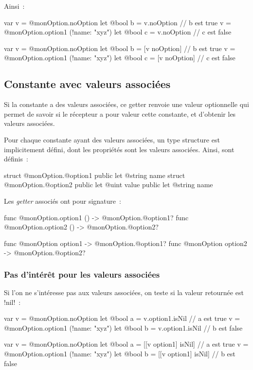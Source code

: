 Ainsi~:

\begin{galgas4}
var v = @monOption.noOption
let @bool b = v.noOption // b est true
v = @monOption.option1 (!name: "xyz")
let @bool c = v.noOption // c est false
\end{galgas4}
\begin{galgas3}
var v = @monOption.noOption
let @bool b = [v noOption] // b est true
v = @monOption.option1 (!name: "xyz")
let @bool c = [v noOption] // c est false
\end{galgas3}

\subsection{Constante avec valeurs associées}

Si la constante a des valeurs associées, ce getter renvoie une valeur optionnelle qui permet de savoir si le récepteur a pour valeur cette constante, et d'obtenir les valeurs associées.

Pour chaque constante ayant des valeurs associées, un type structure est implicitement défini, dont les propriétés sont les valeurs associées. Ainsi, sont définis~:
\begin{galgas4}
struct @monOption.@option1 {
  public let @string name
}
struct @monOption.@option2 {
  public let @uint value
  public let @string name
}
\end{galgas4}

Les \emph{getter} associés ont pour signature~:
\begin{galgas4}
func @monOption.option1 () -> @monOption.@option1?
func @monOption.option2 () -> @monOption.@option2?
\end{galgas4}
\begin{galgas3}
func @monOption option1 -> @monOption.@option1?
func @monOption option2 -> @monOption.@option2?
\end{galgas3}

\subsubsection{Pas d'intérêt pour les valeurs associées}

Si l'on ne s'intéresse pas aux valeurs associées, on teste si la valeur retournée est \ggsq!nil!~:

\begin{galgas4}
var v = @monOption.noOption
let @bool a = v.option1.isNil // a est true
v = @monOption.option1 (!name: "xyz")
let @bool b = v.option1.isNil // b est false
\end{galgas4}
\begin{galgas3}
var v = @monOption.noOption
let @bool a = [[v option1] isNil] // a est true
v = @monOption.option1 (!name: "xyz")
let @bool b = [[v option1] isNil] // b est false
\end{galgas3}

